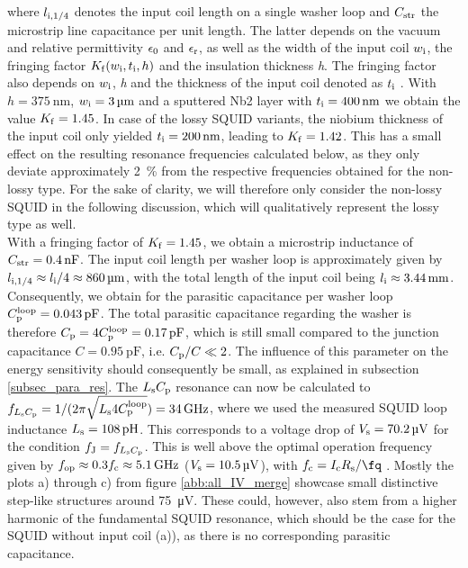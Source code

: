 where $l_{\rm i,1/4}$ denotes the input coil length on a single washer loop and $C_{\rm str}$
the microstrip line capacitance per unit length. The latter depends on the vacuum and relative permittivity $\epsilon_{\rm 0}$ and $\epsilon_{\rm r}$, as well as the width of the input coil $w_{\rm i}$, the fringing factor $K_{\rm f}(w_{\rm i},t_{\rm i},h)$ and the insulation thickness \textit{h}. The fringing factor also depends on $w_{\rm i}$, \textit{h} and the thickness of the input coil denoted as $t_{\rm i}$ \cite{Chang1979}. With $h=\qty{375}{\nm}$, $w_{\rm i}=\qty{3}{\um}$ and a sputtered Nb2 layer with $t_{\rm i}=\qty{400}{\nm}$ we obtain the value $K_{\rm f}=1.45$. In case of the lossy SQUID variants, the niobium thickness of the input coil only yielded $t_{\rm i}=\qty{200}{\nm}$, leading to $K_{\rm f}=1.42$. This has a small effect on the resulting resonance frequencies calculated below, as they only deviate approximately \qty{2}{\percent} from the respective frequencies obtained for the non-lossy type. For the sake of clarity, we will therefore only consider the non-lossy SQUID in the following discussion, which will qualitatively represent the lossy type as well. \\ With a fringing factor of $K_{\rm f}=1.45$, we obtain a microstrip inductance of $C_{\rm str}=\qty{0.4}{\nF}$. The input coil length per washer loop is approximately given by $l_{\rm i,1/4}\approx l_{\rm i}/4\approx\qty{860}{\um}$, with the total length of the input coil being $l_{\rm i}\approx\qty{3.44}{\mm}$. Consequently, we obtain for the parasitic capacitance per washer loop $C_{\rm p}^{\rm loop}=\qty{0.043}{\pF}$. The total parasitic capacitance regarding the washer is therefore $C_{\rm p}=4C_{\rm p}^{\rm loop}=\qty{0.17}{\pF}$, which is still small compared to the junction capacitance $C=\qty{0.95}{\pF}$, i.e. $C_{\rm p}/C\ll 2$. The influence of this parameter on the energy sensitivity should consequently be small, as explained in subsection \ref{subsec_para_res}. The $L_{\rm s}C_{\rm p}$ resonance can now be calculated to $f_{L_{\rm s}C_{\rm p}}=1/(2\pi\sqrt{L_{\rm s}4C_{\rm p}^{\rm loop}})=\qty{34}{\GHz}$, where we used the measured SQUID loop inductance $L_{\rm s}=\qty{108}{\pH}$. This corresponds to a voltage drop of $V_{\rm s}=\qty{70.2}{\uV}$ for the condition $f_{\rm J}=f_{L_{\rm s}C_{\rm p}}$. This is well above the optimal operation frequency given by $f_{\rm op}\approx 0.3f_{\rm c}\approx\qty{5.1}{\GHz}$ ($V_{\rm s}=\qty{10.5}{\uV}$), with $f_{\rm c}=I_{\rm c}R_{\rm s}/\unit{\fq}$ \cite{Cantor1996}. Mostly the plots a) through c) from figure \ref{abb:all_IV_merge} showcase small distinctive step-like structures around \qty{75}{\uV}. These could, however, also stem from a higher harmonic of the fundamental SQUID resonance, which should be the case for the SQUID without input coil (a)), as there is no corresponding parasitic capacitance. \\

